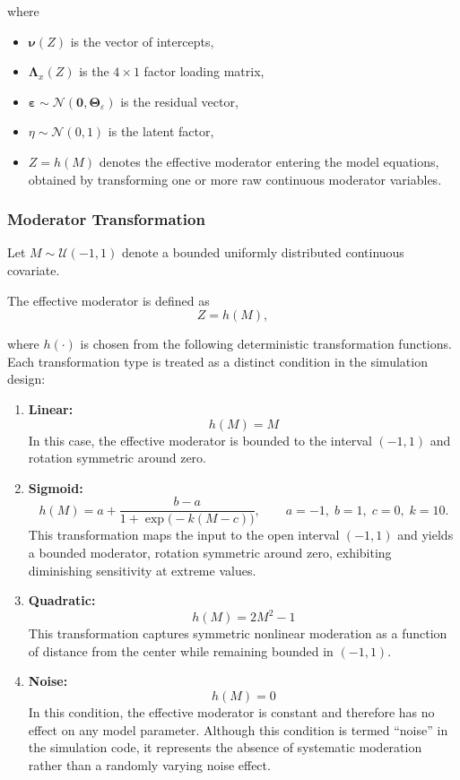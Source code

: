 \documentclass[
  man,
  floatsintext]{apa7}
\providecommand{\tightlist}{%
  \setlength{\itemsep}{0pt}\setlength{\parskip}{0pt}}
\begin{document}
where

\begin{itemize}
\tightlist
\item
  \(\boldsymbol{\nu}(Z)\) is the vector of intercepts,
\item
  \(\boldsymbol{\Lambda}_x(Z)\) is the \(4 \times 1\) factor loading
  matrix,
\item
  \(\boldsymbol{\varepsilon} \sim \mathcal{N}\!\left(\mathbf{0}, \boldsymbol{\Theta}_\varepsilon\right)\)
  is the residual vector,
\item
  \(\eta \sim \mathcal{N}(0,1)\) is the latent factor,
\item
  \(Z = h(M)\) denotes the effective moderator entering the model
  equations, obtained by transforming one or more raw continuous
  moderator variables.
\end{itemize}

\subsubsection{Moderator Transformation}\label{moderator-transformation}

Let \(M \sim \mathcal{U}(-1,1)\) denote a bounded uniformly distributed
continuous covariate.

The effective moderator is defined as \[
Z = h(M),
\]

where \(h(\cdot)\) is chosen from the following deterministic
transformation functions. Each transformation type is treated as a
distinct condition in the simulation design:

\begin{enumerate}
\def\labelenumi{\arabic{enumi}.}
\item
  \textbf{Linear:} \[
  h(M) = M
  \] In this case, the effective moderator is bounded to the interval
  \((-1,1)\) and rotation symmetric around zero.
\item
  \textbf{Sigmoid:} \[
  h(M) = a + \frac{b-a}{1 + \exp\!\bigl(-k(M-c)\bigr)},
  \qquad a=-1,\; b=1,\; c=0,\; k=10.
  \] This transformation maps the input to the open interval \((-1, 1)\)
  and yields a bounded moderator, rotation symmetric around zero,
  exhibiting diminishing sensitivity at extreme values.
\item
  \textbf{Quadratic:} \[
  h(M) = 2M^2 - 1
  \] This transformation captures symmetric nonlinear moderation as a
  function of distance from the center while remaining bounded in
  \((-1,1)\).
\item
  \textbf{Noise:} \[
  h(M) = 0
  \] In this condition, the effective moderator is constant and
  therefore has no effect on any model parameter. Although this
  condition is termed ``noise'' in the simulation code, it represents
  the absence of systematic moderation rather than a randomly varying
  noise effect.
\end{enumerate}
\end{document}
